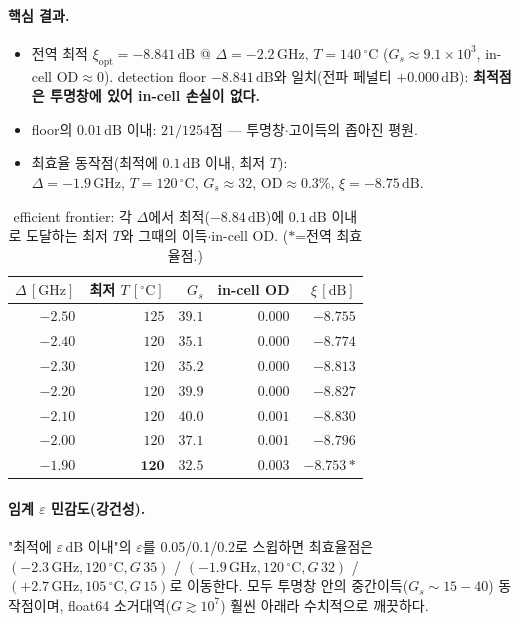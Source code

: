 \documentclass[11pt,a4paper]{article}
\newcommand{\dB}{\,\mathrm{dB}}
\newcommand{\GHz}{\,\mathrm{GHz}}
\newcommand{\degC}{\,^{\circ}\mathrm{C}}
\begin{document}
\paragraph{핵심 결과.}
\begin{itemize}[nosep]
\item 전역 최적 $\xi_{\mathrm{opt}}=-8.841\dB$ @ $\Delta=-2.2\GHz,\,T=140\degC$
      ($G_s\approx9.1\times10^3$, in-cell $\mathrm{OD}\approx0$). detection floor $-8.841\dB$와
      일치(전파 페널티 $+0.000\dB$): \textbf{최적점은 투명창에 있어 in-cell 손실이 없다.}
\item floor의 $0.01\dB$ 이내: $21/1254$점 --- 투명창$\cdot$고이득의 좁아진 평원.
\item 최효율 동작점(최적에 $0.1\dB$ 이내, 최저 $T$): $\Delta=-1.9\GHz,\,T=120\degC,\,
      G_s\approx32,\,\mathrm{OD}\approx0.3\%$, $\xi=-8.75\dB$.
\end{itemize}

\begin{table}[h]
\centering
\caption{efficient frontier: 각 $\Delta$에서 최적($-8.84\dB$)에 $0.1\dB$ 이내로 도달하는 최저
$T$와 그때의 이득$\cdot$in-cell OD. ($*$=전역 최효율점.)}
\label{tab:frontier}
\begin{tabular}{rrrrr}
\toprule
$\Delta\,[\mathrm{GHz}]$ & 최저 $T\,[^{\circ}\mathrm{C}]$ & $G_s$ & in-cell OD & $\xi\,[\mathrm{dB}]$\\
\midrule
$-2.50$ & $125$ & $39.1$ & $0.000$ & $-8.755$\\
$-2.40$ & $120$ & $35.1$ & $0.000$ & $-8.774$\\
$-2.30$ & $120$ & $35.2$ & $0.000$ & $-8.813$\\
$-2.20$ & $120$ & $39.9$ & $0.000$ & $-8.827$\\
$-2.10$ & $120$ & $40.0$ & $0.001$ & $-8.830$\\
$-2.00$ & $120$ & $37.1$ & $0.001$ & $-8.796$\\
$\mathbf{-1.90}$ & $\mathbf{120}$ & $\mathbf{32.5}$ & $\mathbf{0.003}$ & $\mathbf{-8.753}$\,$*$\\
\bottomrule
\end{tabular}
\end{table}

\paragraph{임계 $\varepsilon$ 민감도(강건성).}
"최적에 $\varepsilon\dB$ 이내"의 $\varepsilon$를 0.05/0.1/0.2로 스윕하면 최효율점은
$(-2.3\GHz,120\degC,G\,35)$ / $(-1.9\GHz,120\degC,G\,32)$ / $(+2.7\GHz,105\degC,G\,15)$로
이동한다. 모두 투명창 안의 중간이득($G_s\sim15\!-\!40$) 동작점이며, float64 소거대역($G\gtrsim10^7$)
훨씬 아래라 수치적으로 깨끗하다.
\end{document}
